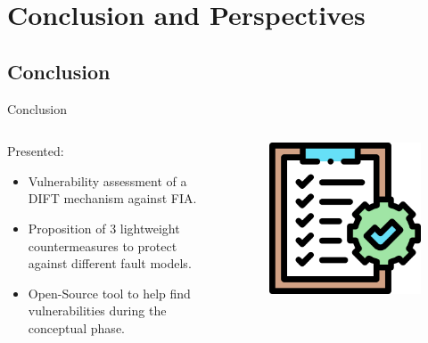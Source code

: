 \section{Conclusion and Perspectives}


\subsection{Conclusion}
\begin{frame}{Conclusion}
    \begin{columns}
        \begin{column}{.7\linewidth}
            \begin{block}{Presented:}
                \begin{itemize}
                    [triangle]
                    \item Vulnerability assessment of a DIFT mechanism against FIA.
                    \item Proposition of 3 lightweight countermeasures to protect against different fault models.
                    \item Open-Source tool to help find vulnerabilities during the conceptual phase.
                \end{itemize}
            \end{block}
        \end{column}
        \begin{column}{.3\linewidth}
            \begin{figure}
                \centering
                \includegraphics[height=.25\textheight]{src/6_conclusion/img/conclusion.png}
            \end{figure}
        \end{column}
    \end{columns}
\end{frame}

